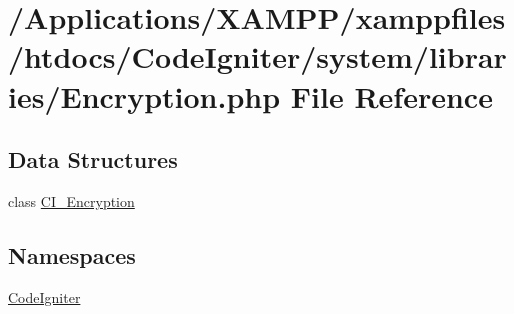 \hypertarget{_encryption_8php}{}\section{/\+Applications/\+X\+A\+M\+P\+P/xamppfiles/htdocs/\+Code\+Igniter/system/libraries/\+Encryption.php File Reference}
\label{_encryption_8php}
\subsection*{Data Structures}
\begin{DoxyCompactItemize}
\item 
class \mbox{\hyperlink{class_c_i___encryption}{C\+I\+\_\+\+Encryption}}
\end{DoxyCompactItemize}
\subsection*{Namespaces}
\begin{DoxyCompactItemize}
\item 
 \mbox{\hyperlink{namespace_code_igniter}{Code\+Igniter}}
\end{DoxyCompactItemize}
